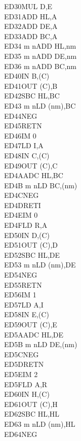 \begin{multicols}{3}
{\begin{tabbing}
	ED30\>MUL D,E\ZXN\\
	ED31\>ADD HL,A\ZXN\\
	ED32\>ADD DE,A\ZXN\\
	ED33\>ADD BC,A\ZXN\\
	ED34 m n\>ADD HL,nm\ZXN\\
	ED35 m n\>ADD DE,nm\ZXN\\
	ED36 m n\>ADD BC,nm\ZXN\\
	ED40\>IN B,(C)\\
	ED41\>OUT (C),B\\
	ED42\>SBC HL,BC\\
	ED43 m n\>LD (nm),BC\\
	ED44\>NEG\\
	ED45\>RETN\\
	ED46\>IM 0\\
	ED47\>LD I,A\\
	ED48\>IN C,(C)\\
	ED49\>OUT (C),C\\
	ED4A\>ADC HL,BC\\
	ED4B m n\>LD BC,(nm)\\
	ED4C\>NEG\UNDOC\\
	ED4D\>RETI\\
	ED4E\>IM 0\UNDOC\\
	ED4F\>LD R,A\\
	ED50\>IN D,(C)\\
	ED51\>OUT (C),D\\
	ED52\>SBC HL,DE\\
	ED53 m n\>LD (nm),DE\\
	ED54\>NEG\UNDOC\\
	ED55\>RETN\UNDOC\\
	ED56\>IM 1\\
	ED57\>LD A,I\\
	ED58\>IN E,(C)\\
	ED59\>OUT (C),E\\
	ED5A\>ADC HL,DE\\
	ED5B m n\>LD DE,(nm)\\
	ED5C\>NEG\UNDOC\\
	ED5D\>RETN\UNDOC\\
	ED5E\>IM 2\\
	ED5F\>LD A,R\\
	ED60\>IN H,(C)\\
	ED61\>OUT (C),H\\
	ED62\>SBC HL,HL\\
	ED63 m n\>LD (nm),HL\\
	ED64\>NEG\UNDOC\\

\end{tabbing}}
\end{multicols}
